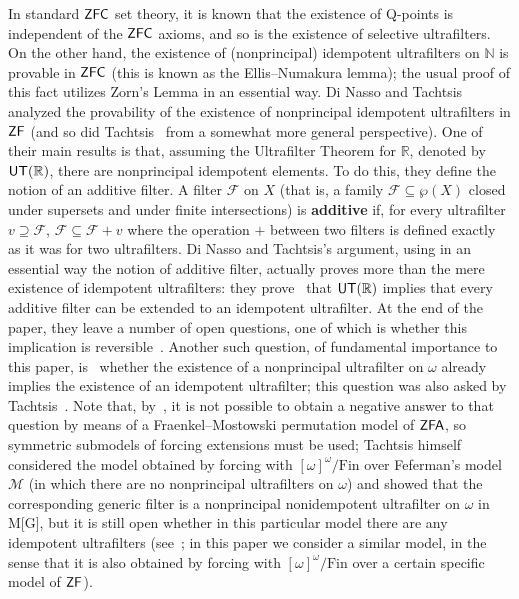 \documentclass[10pt]{amsart}
\newcommand{\zf}{\mathnormal{\mathsf{ZF}}}
\newcommand{\zfc}{\mathnormal{\mathsf{ZFC}}}
\newcommand{\zfa}{\mathnormal{\mathsf{ZFA}}}
\newcommand{\utr}{\mathnormal{\mathsf{UT}(\mathbb R)}}
\theoremstyle{definition}
\theoremstyle{remark}
\begin{document}
In standard $\zfc$ set theory, it is known that the existence of Q-points is independent of the $\zfc$ axioms, and so is the existence of selective ultrafilters. On the other hand, the existence of (nonprincipal) idempotent ultrafilters on $\mathbb N$ is provable in $\zfc$ (this is known as the Ellis--Numakura lemma); the usual proof of this fact utilizes Zorn's Lemma in an essential way. Di Nasso and Tachtsis~\cite{dinasso-tachtsis} analyzed the provability of the existence of nonprincipal idempotent ultrafilters in $\zf$ (and so did Tachtsis~\cite{tachtsis-ellis} from a somewhat more general perspective). One of their main results is that, assuming the Ultrafilter Theorem for $\mathbb R$, denoted by $\utr$, there are nonprincipal idempotent elements. To do this, they define the notion of an additive filter. A filter $\mathscr F$ on $X$ (that is, a family $\mathscr F\subseteq\wp(X)$ closed under supersets and under finite intersections) is {\bf additive} if, for every ultrafilter $v\supseteq\mathscr F$, $\mathscr F\subseteq\mathscr F+v$ where the operation $+$ between two filters is defined exactly as it was for two ultrafilters. Di Nasso and Tachtsis's argument, using in an essential way the notion of additive filter, actually proves more than the mere existence of idempotent ultrafilters: they prove~\cite[Theorem 3.6]{dinasso-tachtsis} that $\utr$ implies that every additive filter can be extended to an idempotent ultrafilter. At the end of the paper, they leave a number of open questions, one of which is whether this implication is reversible~\cite[Question (2), p. 410]{dinasso-tachtsis}. Another such question, of fundamental importance to this paper, is~\cite[Question (5), p. 410]{dinasso-tachtsis} whether the existence of a nonprincipal ultrafilter on $\omega$ already implies the existence of an idempotent ultrafilter; this question was also asked by Tachtsis~\cite[Question 4]{tachtsis-ellis}. Note that, by~\cite[Theorem 2.1 (ii)]{tachtsis-ellis}, it is not possible to obtain a negative answer to that question by means of a Fraenkel--Mostowski permutation model of $\zfa$, so symmetric submodels of forcing extensions must be used; Tachtsis himself~\cite[pp. 565--568]{tachtsis-ellis} considered the model obtained by forcing with $[\omega]^\omega/\mathrm{Fin}$ over Feferman's model $\mathcal M$ (in which there are no nonprincipal ultrafilters on $\omega$) and showed that the corresponding generic filter is a nonprincipal nonidempotent ultrafilter on $\omega$ in M[G], but it is still open whether in this particular model there are any idempotent ultrafilters (see~\cite[Problem 5]{tachtsis-ellis}; in this paper we consider a similar model, in the sense that it is also obtained by forcing with $[\omega]^\omega/\mathrm{Fin}$ over a certain specific model of $\zf$).
\end{document}
